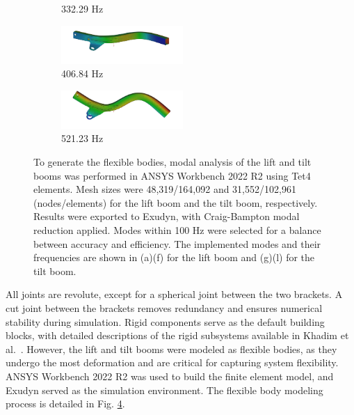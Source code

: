 \begin{figure}[ht]
\begin{subfigure}{0.5\textwidth}
        \caption{332.29 Hz}
        \label{TiltSurrogate}
    \end{subfigure}
    \begin{subfigure}{0.5\textwidth} 
        \centering
        \includegraphics[width=1.82in]{TB05.png}
        \caption{406.84 Hz}
        \label{LiftSurrogate}
    \end{subfigure}%
    \begin{subfigure}{0.5\textwidth} 
        \centering
        \includegraphics[width=1.82in]{TB06.png}
        \caption{521.23 Hz}
        \label{TiltSurrogate}
    \end{subfigure}
    \caption{To generate the flexible bodies, modal analysis of the lift and tilt booms was performed in ANSYS Workbench 2022 R2 using Tet4 elements. Mesh sizes were 48,319/164,092 and 31,552/102,961 (nodes/elements) for the lift boom and the tilt boom, respectively. Results were exported to Exudyn, with Craig-Bampton modal reduction applied. Modes within 100 Hz were selected for a balance between accuracy and efficiency. The implemented modes and their frequencies are shown in (a)\textendash(f) for the lift boom and (g)\textendash(l) for the tilt boom.}
    \label{FEModel}
\end{figure}
All joints are revolute, except for a spherical joint between the two brackets. A cut joint between the brackets removes redundancy and ensures numerical stability during simulation. Rigid components serve as the default building blocks, with detailed descriptions of the rigid subsystems available in Khadim et al.~\cite{KHADIM2023105405}. However, the lift and tilt booms were modeled as flexible bodies, as they undergo the most deformation and are critical for capturing system flexibility. ANSYS Workbench 2022 R2 was used to build the finite element model, and Exudyn served as the simulation environment. The flexible body modeling process is detailed in Fig. \ref{FEModel}.
